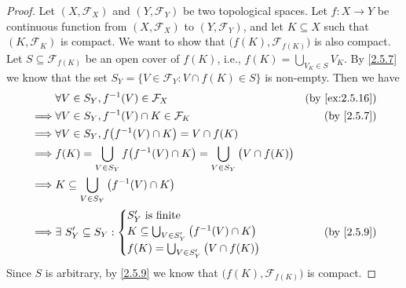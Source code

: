 \begin{proof}
  Let \((X, \mathcal{F}_X)\) and \((Y, \mathcal{F}_Y)\) be two topological spaces.
  Let \(f : X \to Y\) be continuous function from \((X, \mathcal{F}_X)\) to \((Y, \mathcal{F}_Y)\), and let \(K \subseteq X\) such that \((K, \mathcal{F}_K)\) is compact.
  We want to show that \(\big(f(K), \mathcal{F}_{f(K)}\big)\) is also compact.
  Let \(S \subseteq \mathcal{F}_{f(K)}\) be an open cover of \(f(K)\), i.e., \(f(K) = \bigcup_{V_K \in S} V_K\).
  By \cref{2.5.7} we know that the set \(S_Y = \{V \in \mathcal{F}_Y : V \cap f(K) \in S\}\) is non-empty.
  Then we have
  \begin{align*}
             & \forall V \in S_Y, f^{-1}(V) \in \mathcal{F}_X                                                     & \text{(by \cref{ex:2.5.16})} \\
    \implies & \forall V \in S_Y, f^{-1}(V) \cap K \in \mathcal{F}_K                                              & \text{(by \cref{2.5.7})}     \\
    \implies & \forall V \in S_Y, f\big(f^{-1}(V) \cap K\big) = V \cap f(K)                                                                      \\
    \implies & f(K) = \bigcup_{V \in S_Y} f\big(f^{-1}(V) \cap K\big) = \bigcup_{V \in S_Y} \big(V \cap f(K)\big)                                \\
    \implies & K \subseteq \bigcup_{V \in S_Y} \big(f^{-1}(V) \cap K\big)                                                                        \\
    \implies & \exists\ S_Y' \subseteq S_Y : \begin{cases}
                                               S_Y' \text{ is finite}                                      \\
                                               K \subseteq \bigcup_{V \in S_Y'} \big(f^{-1}(V) \cap K\big) \\
                                               f(K) = \bigcup_{V \in S_Y'} \big(V \cap f(K)\big)
                                             \end{cases}                                     & \text{(by \cref{2.5.9})}                          \\
  \end{align*}
  Since \(S\) is arbitrary, by \cref{2.5.9} we know that \(\big(f(K), \mathcal{F}_{f(K)}\big)\) is compact.


\end{proof}
